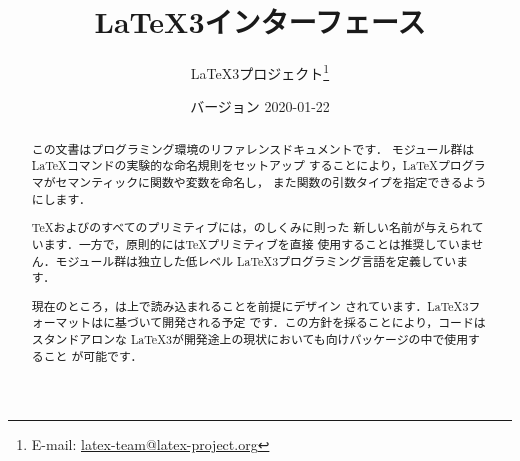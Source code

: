 \documentclass[uplatex,dvipdfmx,kernel]{wtpl3doc}
\begin{document}
\title{\LaTeX3インターフェース}
\author{%
 \LaTeX3プロジェクト\thanks
   {%
     E-mail:
       \href{mailto:latex-team@latex-project.org}
         {latex-team@latex-project.org}%
   }%
}
\date{バージョン 2020-01-22}

\maketitle

\begin{abstract}

\setlength\parindent{0pt}
\setlength\parskip{\baselineskip}

\noindent
この文書はプログラミング環境のリファレンスドキュメントです．
モジュール群は\LaTeX コマンドの実験的な命名規則をセットアップ
することにより，\LaTeX プログラマがセマンティックに関数や変数を命名し，
また関数の引数タイプを指定できるようにします．

\TeX および\eTeX のすべてのプリミティブには，のしくみに則った
新しい名前が与えられています．一方で，原則的には\TeX プリミティブを直接
使用することは推奨していません．モジュール群は独立した低レベル
\LaTeX3プログラミング言語を定義しています．

現在のところ，は\LaTeXe 上で読み込まれることを前提にデザイン
されています．\LaTeX3フォーマットはに基づいて開発される予定
です．この方針を採ることにより，コードはスタンドアロンな
\LaTeX3が開発途上の現状においても\LaTeXe 向けパッケージの中で使用すること
が可能です．


\end{abstract}
\end{document}
